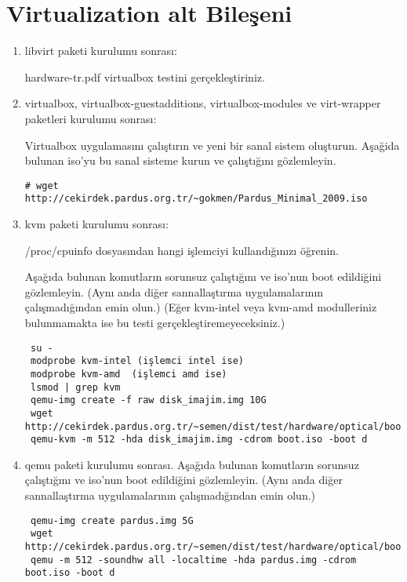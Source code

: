 \documentclass[a4paper,10pt]{article}
\begin{document}
\section{Virtualization alt Bileşeni}
\begin{enumerate}
 \item libvirt paketi kurulumu sonrası:

hardware-tr.pdf virtualbox testini gerçekleştiriniz.
 \item virtualbox, virtualbox-guestadditions, virtualbox-modules ve virt-wrapper paketleri kurulumu sonrası:
 
Virtualbox uygulamasını çalıştırın ve yeni bir sanal sistem oluşturun. Aşağida bulunan iso'yu bu sanal sisteme kurun ve çalıştığını gözlemleyin.
\begin{verbatim}
# wget http://cekirdek.pardus.org.tr/~gokmen/Pardus_Minimal_2009.iso
\end{verbatim}
 \item kvm paketi kurulumu sonrası:

/proc/cpuinfo dosyasından hangi işlemciyi kullandığınızı öğrenin.

Aşağıda bulunan komutların sorunsuz çalıştığını ve iso'nun boot edildiğini gözlemleyin. (Aynı anda diğer sannallaştırma uygulamalarının çalışmadığından emin olun.) (Eğer kvm-intel veya kvm-amd modulleriniz bulunmamakta ise bu testi gerçekleştiremeyeceksiniz.)

\begin{verbatim}
 su -
 modprobe kvm-intel (işlemci intel ise)
 modprobe kvm-amd  (işlemci amd ise)
 lsmod | grep kvm 
 qemu-img create -f raw disk_imajim.img 10G 
 wget http://cekirdek.pardus.org.tr/~semen/dist/test/hardware/optical/boot.iso
 qemu-kvm -m 512 -hda disk_imajim.img -cdrom boot.iso -boot d 
\end{verbatim}

\item qemu paketi kurulumu sonrası.
Aşağıda bulunan komutların sorunsuz çalıştığını ve iso'nun boot edildiğini gözlemleyin. (Aynı anda diğer sannallaştırma uygulamalarının çalışmadığından emin olun.)
\begin{verbatim}
 qemu-img create pardus.img 5G
 wget http://cekirdek.pardus.org.tr/~semen/dist/test/hardware/optical/boot.iso
 qemu -m 512 -soundhw all -localtime -hda pardus.img -cdrom boot.iso -boot d
\end{verbatim}


\end{enumerate}
\end{document}
